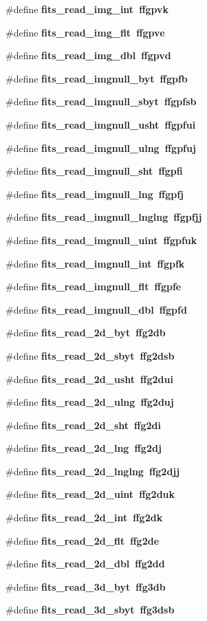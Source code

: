 \begin{CompactItemize}
\#define \bf{fits\_\-read\_\-img\_\-int}~ffgpvk
\item 
\#define \bf{fits\_\-read\_\-img\_\-flt}~ffgpve
\item 
\#define \bf{fits\_\-read\_\-img\_\-dbl}~ffgpvd
\item 
\#define \bf{fits\_\-read\_\-imgnull\_\-byt}~ffgpfb
\item 
\#define \bf{fits\_\-read\_\-imgnull\_\-sbyt}~ffgpfsb
\item 
\#define \bf{fits\_\-read\_\-imgnull\_\-usht}~ffgpfui
\item 
\#define \bf{fits\_\-read\_\-imgnull\_\-ulng}~ffgpfuj
\item 
\#define \bf{fits\_\-read\_\-imgnull\_\-sht}~ffgpfi
\item 
\#define \bf{fits\_\-read\_\-imgnull\_\-lng}~ffgpfj
\item 
\#define \bf{fits\_\-read\_\-imgnull\_\-lnglng}~ffgpfjj
\item 
\#define \bf{fits\_\-read\_\-imgnull\_\-uint}~ffgpfuk
\item 
\#define \bf{fits\_\-read\_\-imgnull\_\-int}~ffgpfk
\item 
\#define \bf{fits\_\-read\_\-imgnull\_\-flt}~ffgpfe
\item 
\#define \bf{fits\_\-read\_\-imgnull\_\-dbl}~ffgpfd
\item 
\#define \bf{fits\_\-read\_\-2d\_\-byt}~ffg2db
\item 
\#define \bf{fits\_\-read\_\-2d\_\-sbyt}~ffg2dsb
\item 
\#define \bf{fits\_\-read\_\-2d\_\-usht}~ffg2dui
\item 
\#define \bf{fits\_\-read\_\-2d\_\-ulng}~ffg2duj
\item 
\#define \bf{fits\_\-read\_\-2d\_\-sht}~ffg2di
\item 
\#define \bf{fits\_\-read\_\-2d\_\-lng}~ffg2dj
\item 
\#define \bf{fits\_\-read\_\-2d\_\-lnglng}~ffg2djj
\item 
\#define \bf{fits\_\-read\_\-2d\_\-uint}~ffg2duk
\item 
\#define \bf{fits\_\-read\_\-2d\_\-int}~ffg2dk
\item 
\#define \bf{fits\_\-read\_\-2d\_\-flt}~ffg2de
\item 
\#define \bf{fits\_\-read\_\-2d\_\-dbl}~ffg2dd
\item 
\#define \bf{fits\_\-read\_\-3d\_\-byt}~ffg3db
\item 
\#define \bf{fits\_\-read\_\-3d\_\-sbyt}~ffg3dsb
\item 

\end{CompactItemize}

